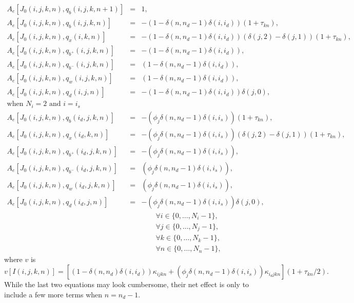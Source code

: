 \documentclass{report}[fleqn,12pt]
\begin{document}
\begin{eqnarray}
        \label{Eq:B2}
        A_e[J_0(i, j, k, n), q_b(i, j, k, n+1)] &=& 1, \nonumber \\
        A_e[J_0(i, j, k, n), q_b(i, j, k, n)] &=& - (1 - \delta(n, n_d-1)\delta(i, i_d))
                (1 + \tau_{kn}), \nonumber \\
        A_e[J_0(i, j, k, n), q_x(i, k, n)] &=& - (1 - \delta(n, n_d-1)\delta(i, i_d))
                (\delta(j, 2) - \delta(j, 1))
                (1 + \tau_{kn}), \nonumber \\
        A_e[J_0(i, j, k, n), q_{b^+}(i, j, k, n)] &=& - (1 - \delta(n, n_d-1)\delta(i, i_d)),
                \nonumber \\
	A_e[J_0(i, j, k, n), q_{b^-}(i, j, k, n)] &=&  (1 - \delta(n, n_d-1)\delta(i, i_d)),
                \nonumber \\
        A_e[J_0(i, j, k, n), q_w(i, j, k, n)] &=& (1 - \delta(n, n_d-1)\delta(i, i_d)), \nonumber \\
        A_e[J_0(i, j, k, n), q_d(i, j, n)] &=& - (1 - \delta(n, n_d-1)\delta(i, i_d))
                \delta(j, 0), \nonumber \\
		\text{when $N_i =2$ and $i = i_s$} && \nonumber\\
        A_e[J_0(i, j, k, n), q_b(i_d, j, k, n)] &=& - (\phi_j\delta(n, n_d-1)\delta(i, i_s))
                (1 + \tau_{kn}), \nonumber \\
        A_e[J_0(i, j, k, n), q_x(i_d, k, n)] &=& - (\phi_j\delta(n, n_d-1)\delta(i, i_s))
                (\delta(j, 2) - \delta(j, 1))
                (1 + \tau_{kn}), \nonumber \\
        A_e[J_0(i, j, k, n), q_{b^+}(i_d, j, k, n)] &=& - (\phi_j\delta(n, n_d-1)\delta(i, i_s)),
                \nonumber \\
        A_e[J_0(i, j, k, n), q_{b^-}(i_d, j, k, n)] &=& (\phi_j\delta(n, n_d-1)\delta(i, i_s)),
                \nonumber \\
        A_e[J_0(i, j, k, n), q_w(i_d, j, k, n)] &=& (\phi_j\delta(n, n_d-1)\delta(i, i_s)),
                \nonumber \\
        A_e[J_0(i, j, k, n), q_d(i_d, j, n)] &=&  -(\phi_j\delta(n, n_d-1)\delta(i, i_s))
                \delta(j, 0), \nonumber \\
        &&\qquad\forall i \in \{0,\ldots, N_i-1\},\nonumber\\
        &&\qquad\forall j \in \{0,\ldots, N_j-1\},\nonumber\\
        &&\qquad\forall k \in \{0,\ldots, N_k-1\},\nonumber\\
        &&\qquad\forall n \in \{0,\ldots, N_n-1\}, \nonumber
\end{eqnarray}
where $v$ is
\begin{equation}
	v[I(i, j, k, n)] 
	= [(1 - \delta(n, n_d)\delta(i, i_d))
	\kappa_{ijkn} + (\phi_j\delta(n, n_d-1)\delta(i, i_s))\kappa_{i_djkn}](1 + \tau_{kn}/2). 
\end{equation}
While the last two equations may look cumbersome, their net effect is only to include
a few more terms when $n=n_d-1$. 
\end{document}
